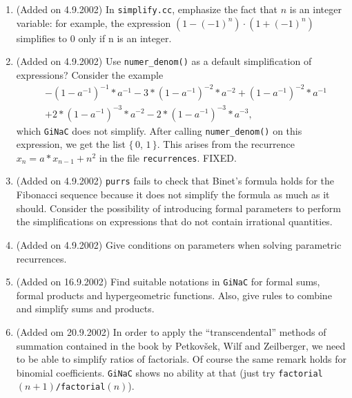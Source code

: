 \documentclass[a4paper]{article}
\begin{document}
\begin{enumerate}

\item (Added on 4.9.2002)
In \texttt{simplify.cc}, emphasize the fact that $n$  is an integer variable:
for example, the expression $(1-(-1)^n) \cdot (1+(-1)^n)$ simplifies to 
0 only if n is an integer.

\item (Added on 4.9.2002)
Use \texttt{numer\_denom()} as a default simplification of expressions?
Consider the example
\[
  \begin{aligned}
  &-(1-a^{-1})^{-1}*a^{-1}
  -
  3*(1-a^{-1})^{-2}*a^{-2}
  +
  (1-a^{-1})^{-2}*a^{-1} \\
  &+
  2*(1-a^{-1})^{-3}*a^{-2}
  -
  2*(1-a^{-1})^{-3}*a^{-3},
  \end{aligned}
\]
which \texttt{GiNaC} does not simplify. After calling 
\texttt{numer\_denom()} on this
expression, we get the list $\{\, 0$, $1\,\}$.
This arises from the recurrence $x_n = a*x_{n-1} + n^2$ in the
file \texttt{recurrences}.
FIXED.

\item (Added on 4.9.2002)
\texttt{purrs} fails to check that Binet's formula holds for the Fibonacci
sequence because it does not simplify the formula as much as it should.
Consider the possibility of introducing formal parameters to perform the
simplifications on expressions that do not contain irrational quantities.

\item (Added on 4.9.2002)
Give conditions on parameters when solving parametric recurrences.

\item (Added on 16.9.2002)
Find suitable notations in \texttt{GiNaC} for formal sums, formal products
and hypergeometric functions.
Also, give rules to combine and simplify sums and products.

\item (Added om 20.9.2002)
In order to apply the ``transcendental'' methods of summation contained
in the book by Petkov\v sek, Wilf and Zeilberger, we
need to be able to simplify ratios of factorials.
Of course the same remark holds for binomial coefficients.
\texttt{GiNaC} shows no ability at that (just try
\texttt{factorial$(n+1)$/factorial$(n)$}).


\end{enumerate}
\end{document}
